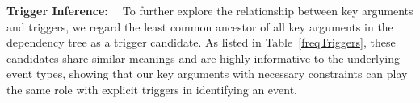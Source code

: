 

\noindent\textbf{Trigger Inference: \mbox{ }} To further explore the relationship between key arguments and triggers, we regard the least common ancestor of all key arguments in the dependency tree as a trigger candidate. As listed in Table~\ref{freqTriggers}, these candidates share similar meanings and are highly informative to the underlying event types, showing that our key arguments with necessary constraints can play the same role with explicit triggers in identifying an event.

